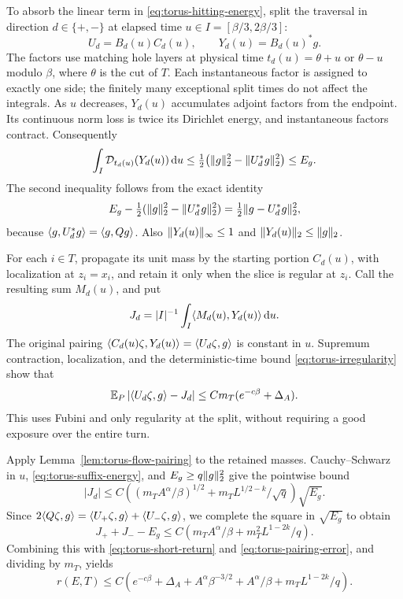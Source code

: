 To absorb the linear term in \eqref{eq:torus-hitting-energy}, split
the traversal in direction \(d\in\{+,-\}\) at elapsed time
\(u\in I=[\beta/3,2\beta/3]\):
\[
 U_d=B_d(u)C_d(u),\qquad Y_d(u)=B_d(u)^*g.
\]
The factors use matching hole layers at physical time
\(t_d(u)=\theta+u\) or \(\theta-u\) modulo \(\beta\), where
\(\theta\) is the cut of \(T\).  Each instantaneous factor is
assigned to exactly one side; the finitely many exceptional split
times do not affect the integrals.  As \(u\) decreases, \(Y_d(u)\)
accumulates adjoint factors from the endpoint.  Its continuous norm
loss is twice its Dirichlet energy, and instantaneous factors contract.
Consequently
\begin{equation}\label{eq:torus-suffix-energy}
 \int_I\mathcal D_{t_d(u)}(Y_d(u))\,\mathrm d u
 \le\tfrac12\bigl(\lVert g\rVert_2^2-\lVert U_d^*g\rVert_2^2\bigr)
 \le E_g.
\end{equation}
The second inequality follows from the exact identity
\[
 E_g-\tfrac12(\lVert g\rVert_2^2-\lVert U_d^*g\rVert_2^2)
       =\tfrac12\lVert g-U_d^*g\rVert_2^2,
\]
because \(\langle g,U_d^*g\rangle=\langle g,Qg\rangle\).
Also \(\lVert Y_d(u)\rVert_\infty\le1\) and
\(\lVert Y_d(u)\rVert_2\le\lVert g\rVert_2\).

For each \(i\in T\), propagate its unit mass by the starting
portion \(C_d(u)\), with localization at \(z_i=x_i\), and retain
it only when the slice is regular at \(z_i\).  Call the resulting
sum \(M_d(u)\), and put
\[
 J_d=|I|^{-1}\int_I\langle M_d(u),Y_d(u)\rangle\,\mathrm d u.
\]
The original pairing
\(\langle C_d(u)\zeta,Y_d(u)\rangle=\langle U_d\zeta,g\rangle\) is constant in
\(u\).  Supremum contraction, localization, and the deterministic-time
bound \eqref{eq:torus-irregularity} show that
\begin{equation}\label{eq:torus-pairing-error}
 \mathbb E_P\left|\langle U_d\zeta,g\rangle-J_d\right|
 \le Cm_T(e^{-c\beta}+\Delta_A).
\end{equation}
This uses Fubini and only regularity at the split, without requiring a
good exposure over the entire turn.

Apply Lemma~\ref{lem:torus-flow-pairing} to the retained masses.
Cauchy--Schwarz in \(u\), \eqref{eq:torus-suffix-energy}, and
\(E_g\ge q\lVert g\rVert_2^2\) give the pointwise bound
\begin{equation}\label{eq:torus-linear-energy}
 |J_d|\le C\left((m_TA^\alpha/\beta)^{1/2}
           +m_TL^{1/2-k}/\sqrt q\right)\sqrt{E_g}.
\end{equation}
Since \(2\langle Q\zeta,g\rangle=\langle U_+\zeta,g\rangle+\langle U_-\zeta,g\rangle\),
we complete the square in \(\sqrt{E_g}\) to obtain
\[
 J_++J_--E_g
 \le C\left(m_TA^\alpha/\beta+m_T^2L^{1-2k}/q\right).
\]
Combining this with \eqref{eq:torus-short-return} and
\eqref{eq:torus-pairing-error}, and dividing by \(m_T\), yields
\begin{equation}\label{eq:torus-return-bound}
 r(E,T)\le C\left(e^{-c\beta}+\Delta_A
     +A^\alpha\beta^{-3/2}+A^\alpha/\beta
     +m_TL^{1-2k}/q\right).
\end{equation}

